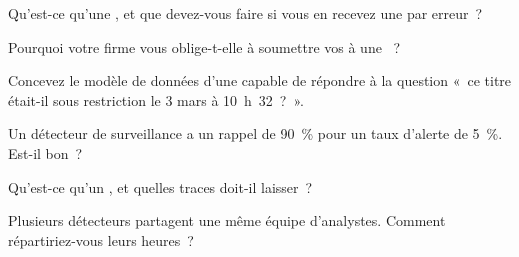 \begin{interviewq}\label{iq:fm:compliance-and-market-abuse:1}
Qu'est-ce qu'une , et que devez-vous faire si vous en recevez une par erreur~?
\end{interviewq}

\begin{interviewq}\label{iq:fm:compliance-and-market-abuse:2}
Pourquoi votre firme vous oblige-t-elle à soumettre vos  à une ~?
\end{interviewq}

\begin{interviewq}\label{iq:fm:compliance-and-market-abuse:3}
Concevez le modèle de données d'une  capable de répondre à la question «~ce titre était-il sous restriction le 3 mars à 10~h~32~?~».
\end{interviewq}

\begin{interviewq}\label{iq:fm:compliance-and-market-abuse:4}
Un détecteur de surveillance a un rappel de 90~\% pour un taux d'alerte de 5~\%. Est-il bon~?
\end{interviewq}

\begin{interviewq}\label{iq:fm:compliance-and-market-abuse:5}
Qu'est-ce qu'un , et quelles traces doit-il laisser~?
\end{interviewq}

\begin{interviewq}\label{iq:fm:compliance-and-market-abuse:6}
Plusieurs détecteurs partagent une même équipe d'analystes. Comment répartiriez-vous leurs heures~?
\end{interviewq}
